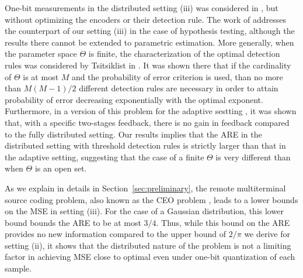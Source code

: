 \documentclass[letterpaper, conference, 11pt]{IEEEtran}      %
\begin{document}
One-bit measurements in the distributed setting (iii) was considered in \cite{904560,4244748, 6882252, chen2010performance, 5184907}, but without optimizing the encoders or their detection rule. %
The work of \cite{52470} addresses the counterpart of our setting (iii) in the case of hypothesis testing, although the results there cannot be extended to parametric estimation. More generally, when the parameter space $\Theta$ is finite, the characterization of the optimal detection rules was considered by Tsitsiklist in \cite{tsitsiklis1988decentralized}. It was shown there that if the cardinality of $\Theta$ is at most $M$ and the probability of error criterion is used, than no more than $M(M-1)/2$ different detection rules are necessary in order to attain probability of error decreasing exponentially with the optimal exponent. %
Furthermore, in a version of this problem for the adaptive sestting \cite{5751320}, it was shown that, with a specific two-stages feedback, there is no gain in feedback compared to the fully distributed setting. Our results implies that the ARE in the distributed setting with threshold detection rules is strictly larger than that in the adaptive setting, suggesting that the case of a finite $\Theta$ is very different than when $\Theta$ is an open set.\par
%
As we explain in details in Section~\ref{sec:preliminary}, the remote multiterminal source coding problem, also known as the CEO problem \cite{berger1996ceo, viswanathan1997quadratic, oohama1998rate, prabhakaran2004rate}, leads to a lower bounds on the MSE in setting (iii). For the case of a Gaussian distribution, this lower bound bounds the ARE to be at most $3/4$. Thus, while this bound on the ARE provides no new information compared to the upper bound of $2/\pi$ we derive for setting (ii), it shows that the distributed nature of the problem is not a limiting factor in achieving MSE close to optimal even under one-bit quantization of each sample.\\
\end{document}
